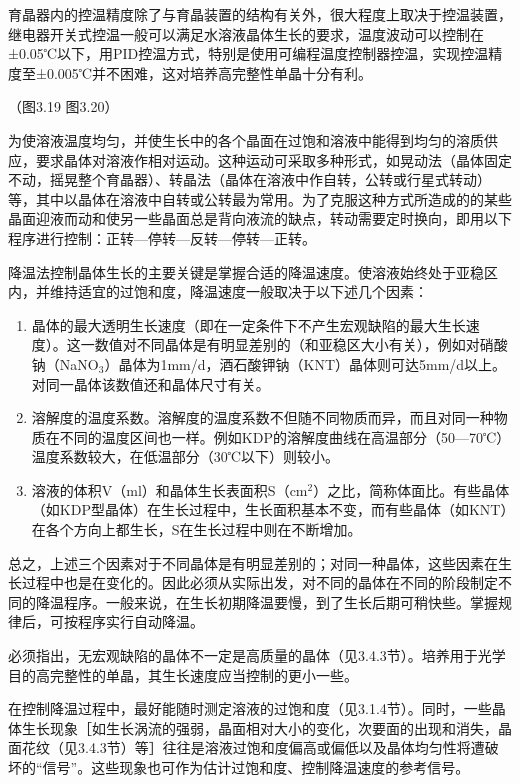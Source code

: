 育晶器内的控温精度除了与育晶装置的结构有关外，很大程度上取决于控温装置，继电器开关式控温一般可以满足水溶液晶体生长的要求，温度波动可以控制在±0.05℃以下，用PID控温方式，特别是使用可编程温度控制器控温，实现控温精度至±0.005℃并不困难，这对培养高完整性单晶十分有利。

（图3.19 图3.20）

为使溶液温度均匀，并使生长中的各个晶面在过饱和溶液中能得到均匀的溶质供应，要求晶体对溶液作相对运动。这种运动可采取多种形式，如晃动法（晶体固定不动，摇晃整个育晶器）、转晶法（晶体在溶液中作自转，公转或行星式转动）等，其中以晶体在溶液中自转或公转最为常用。为了克服这种方式所造成的的某些晶面迎液而动和使另一些晶面总是背向液流的缺点，转动需要定时换向，即用以下程序进行控制：正转---停转---反转---停转---正转。

降温法控制晶体生长的主要关键是掌握合适的降温速度。使溶液始终处于亚稳区内，并维持适宜的过饱和度，降温速度一般取决于以下述几个因素：
\begin{enumerate}[(1)]
\item 晶体的最大透明生长速度（即在一定条件下不产生宏观缺陷的最大生长速度）。这一数值对不同晶体是有明显差别的（和亚稳区大小有关），例如对硝酸钠（NaNO$_3$）晶体为1mm/d，酒石酸钾钠（KNT）晶体则可达5mm/d以上。对同一晶体该数值还和晶体尺寸有关。
\item 溶解度的温度系数。溶解度的温度系数不但随不同物质而异，而且对同一种物质在不同的温度区间也一样。例如KDP的溶解度曲线在高温部分（50---70℃）温度系数较大，在低温部分（30℃以下）则较小。
\item 溶液的体积V（ml）和晶体生长表面积S（cm$^2$）之比，简称体面比。有些晶体（如KDP型晶体）在生长过程中，生长面积基本不变，而有些晶体（如KNT）在各个方向上都生长，S在生长过程中则在不断增加。
\end{enumerate}

总之，上述三个因素对于不同晶体是有明显差别的；对同一种晶体，这些因素在生长过程中也是在变化的。因此必须从实际出发，对不同的晶体在不同的阶段制定不同的降温程序。一般来说，在生长初期降温要慢，到了生长后期可稍快些。掌握规律后，可按程序实行自动降温。

必须指出，无宏观缺陷的晶体不一定是高质量的晶体（见3.4.3节）。培养用于光学目的高完整性的单晶，其生长速度应当控制的更小一些。

在控制降温过程中，最好能随时测定溶液的过饱和度（见3.1.4节）。同时，一些晶体生长现象［如生长涡流的强弱，晶面相对大小的变化，次要面的出现和消失，晶面花纹（见3.4.3节）等］往往是溶液过饱和度偏高或偏低以及晶体均匀性将遭破坏的“信号”。这些现象也可作为估计过饱和度、控制降温速度的参考信号。